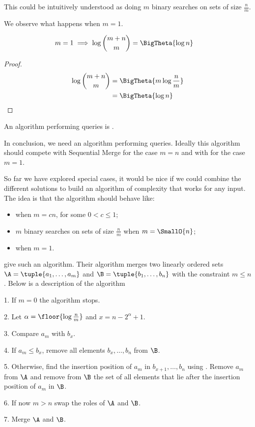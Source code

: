 This could be intuitively understood as doing $m$ binary searches on sets of
size $\frac{n}{m}$.

We observe what happens when $m = 1$.
\begin{lemma}
\begin{align*}
m = 1 &\implies \log\binom{m+n}{m} = \BigTheta{\log n}
\end{align*}
\end{lemma}
\begin{proof}
\begin{align*}
\log\binom{m+n}{m} &= \BigTheta{m \log\frac{n}{m}}\\
&= \BigTheta{\log n}\qedhere
\end{align*}
\end{proof}

An algorithm performing  queries is \binarysearch.

In conclusion, we need an algorithm performing  queries.
Ideally this algorithm should compete with Sequential Merge for the case
$m = n$ and with \binarysearch for the case $m = 1$.

So far we have explored special cases, it would be nice if we could
combine the different solutions to build an algorithm of complexity  that works for any input.
The idea is that the algorithm should behave like:
\begin{itemize}
\item \tapemerge when $m = cn$, for some \(0 < c \le 1\);
\item $m$ binary searches on sets of size $\frac{n}{m}$ when $m = \SmallO{n}$;
\item \binarysearch when \(m = 1\).
\end{itemize}

\citet*{DBLP:journals/siamcomp/HwangL72} give such an algorithm. Their
algorithm merges two linearly ordered sets \(\A = \tuple{a_1,\dots,a_m}\) and
\(\B = \tuple{b_1,\dots,b_n}\) with the constraint \(m \le n\). Below is a
description of the algorithm
\begin{algorithm}
\item[1.] If \(m = 0\) the algorithm stops.
\item[2.] Let \(\alpha = \floor{\log \frac{n}{m}}\) and \(x = n - 2^{\alpha} + 1\).
\item[3.] Compare \(a_m\) with \(b_x\).
\item[4.] If \(a_m \le b_x\), remove all elements \(b_x,\dots,b_n\) from
\(\B\).
\item[5.] Otherwise, find the insertion position of \(a_m\) in
\(b_{x+1},\dots,b_{n}\) using \binarysearch. Remove \(a_m\) from \(\A\) and
remove from \(\B\) the set of all elements that lie after the insertion
position of \(a_m\) in \(\B\).
\item[6.] If now \(m > n\) swap the roles of \(\A\) and \(\B\).
\item[7.] Merge \(\A\) and \(\B\).
\end{algorithm}

